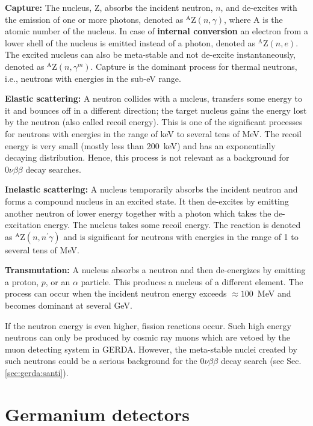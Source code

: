 \textbf{Capture:} The nucleus, Z, absorbs the incident neutron, $n$, and de-excites with the emission of one or more photons, denoted as $^{\text{A}}$Z$(n,\gamma)$, where A is the atomic number of the nucleus. In case of \textbf{internal conversion} an electron from a lower shell of the nucleus is emitted instead of a photon, denoted as $^{\text{A}}$Z$(n,e)$. The excited nucleus can also be meta-stable and not de-excite instantaneously, denoted as $^{\text{A}}$Z$(n,\gamma^{m})$. Capture is the dominant process for thermal neutrons, \textup{i.e.}, neutrons with energies in the sub-eV range.

\textbf{Elastic scattering:} A neutron collides with a nucleus, transfers some energy to it and bounces off in a different direction; the target nucleus gains the energy lost by the neutron (also called recoil energy). This is one of the significant processes for neutrons with energies in the range of keV to several tens of MeV. The recoil energy is very small (mostly less than 200~keV) and has an exponentially decaying distribution. Hence, this process is not relevant as a background for $0\nu\beta\beta$ decay searches.

\textbf{Inelastic scattering:} A nucleus temporarily absorbs the incident neutron and forms a compound nucleus in an excited state. It then de-excites by emitting another neutron of lower energy together with a photon which takes the de-excitation energy. The nucleus takes some recoil energy. The reaction is denoted as $^{\text{A}}$Z$(n,n^{\prime}\gamma)$ and is significant for neutrons with energies in the range of 1 to several tens of MeV.

\textbf{Transmutation:} A nucleus absorbs a neutron and then de-energizes by emitting a proton, $p$, or an $\alpha$ particle. This produces a nucleus of a different element. The process can occur when the incident neutron energy exceeds $\approx 100$~MeV and becomes dominant at several GeV.

If the neutron energy is even higher, fission reactions occur. Such high energy neutrons can only be produced by cosmic ray muons which are vetoed by the muon detecting system in GERDA. However, the meta-stable nuclei created by such neutrons could be a serious background for the $0\nu\beta\beta$ decay search (see Sec.\ref{sec:gerda:santi}).


\section{Germanium detectors}
\label{sec:det:semi}

